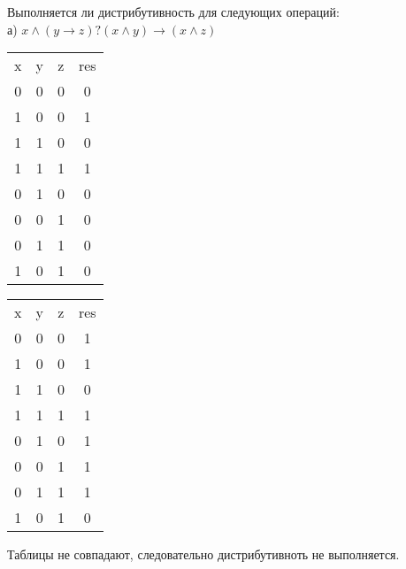 \documentclass{article}
\begin{document}
\section{}
Выполняется ли дистрибутивность для следующих операций:\\
а)
\begin{math}
x\wedge(y\rightarrow z) ? (x\wedge y) \rightarrow (x\wedge z)
\end{math}
\begin{center}
\begin{tabular}{ |c|c|c|c| } 
 \hline
 x & y & z & res \\
 0 & 0 & 0 & 0 \\ 
 1 & 0 & 0 & 1 \\ 
 1 & 1 & 0 & 0 \\ 
 1 & 1 & 1 & 1 \\ 
 0 & 1 & 0 & 0 \\ 
 0 & 0 & 1 & 0 \\ 
 0 & 1 & 1 & 0 \\
 1 & 0 & 1 & 0 \\
 \hline
\end{tabular}
\begin{tabular}{ |c|c|c|c| } 
 \hline
 x & y & z & res \\
 0 & 0 & 0 & 1 \\ 
 1 & 0 & 0 & 1 \\ 
 1 & 1 & 0 & 0 \\ 
 1 & 1 & 1 & 1 \\ 
 0 & 1 & 0 & 1 \\ 
 0 & 0 & 1 & 1 \\ 
 0 & 1 & 1 & 1 \\
 1 & 0 & 1 & 0 \\
 \hline
\end{tabular}
\end{center}
Таблицы не совпадают, следовательно дистрибутивноть не выполняется.
\end{document}
